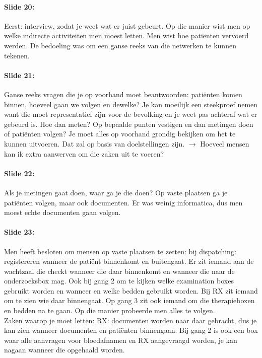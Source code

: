 \documentclass[10pt,a4paper]{report}
\begin{document}
\paragraph{Slide 20:} Eerst: interview, zodat je weet wat er juist gebeurt. Op die manier wist men op welke indirecte activiteiten men moest letten. Men wist hoe pati\"enten vervoerd werden. De bedoeling was om een ganse reeks van die netwerken te kunnen tekenen.

\paragraph{Slide 21:} Ganse reeks vragen die je op voorhand moet beantwoorden: pati\"enten komen binnen, hoeveel gaan we volgen en dewelke? Je kan moeilijk een steekproef nemen want die moet representatief zijn voor de bevolking en je weet pas achteraf wat er gebeurd is. Hoe dan meten? Op bepaalde punten vestigen en dan metingen doen of pati\"enten volgen? Je moet alles op voorhand grondig bekijken om het te kunnen uitvoeren. Dat zal op basis van doelstellingen zijn. $\rightarrow$ Hoeveel mensen kan ik extra aanwerven om die zaken uit te voeren?

\paragraph{Slide 22:} Als je metingen gaat doen, waar ga je die doen? Op vaste plaatsen ga je pati\"enten volgen, maar ook documenten. Er was weinig informatica, dus men moest echte documenten gaan volgen.

\paragraph{Slide 23:} Men heeft besloten om mensen op vaste plaatsen te zetten: bij dispatching: registereren wanneer de pati\"ent binnenkomt en buitengaat. Er zit iemand aan de wachtzaal die checkt wanneer die daar binnenkomt en wanneer die naar de onderzoeksbox mag. Ook bij gang 2 om te kijken welke examination boxes gebruikt worden en wanneer en welke bedden gebruikt worden. Bij RX zit iemand om te zien wie daar binnengaat. Op gang 3 zit ook iemand om die therapieboxen en bedden na te gaan. Op die manier probeerde men alles te volgen.\\
Zaken waarop je moet letten: RX: documenten worden naar daar gebracht, dus je kan zien wanneer documenten en pati\"enten binnengaan. Bij gang 2 is ook een box waar alle aanvragen voor bloedafnamen en RX aangevraagd worden, je kan nagaan wanneer die opgehaald worden. 
\end{document}

